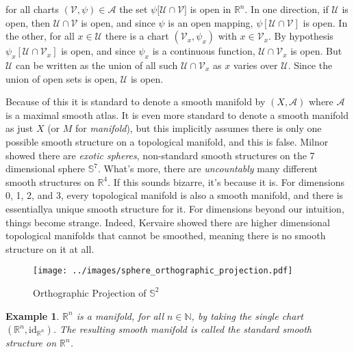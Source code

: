 \documentclass{article}
\theoremstyle{plain}
\theoremstyle{normal}
\newtheorem{example}{Example}[section]
\begin{document}
        for all charts $(\mathcal{V},\psi)\in\mathcal{A}$ the set
        $\psi\big[\mathcal{U}\cap\mathcal{V}]$ is open in $\mathbb{R}^{n}$. In
        one direction, if $\mathcal{U}$ is open, then
        $\mathcal{U}\cap\mathcal{V}$ is open, and since $\psi$ is an open
        mapping, $\psi[\mathcal{U}\cap\mathcal{V}]$ is open. In the other,
        for all $x\in\mathcal{U}$ there is a chart
        $(\mathcal{V}_{x},\psi_{x})$ with $x\in\mathcal{V}_{x}$. By hypothesis
        $\psi_{x}[\mathcal{U}\cap\mathcal{V}_{x}]$ is open,
        and since $\psi_{x}$ is a continuous function,
        $\mathcal{U}\cap\mathcal{V}_{x}$ is open. But $\mathcal{U}$ can be
        written as the union of all such $\mathcal{U}\cap\mathcal{V}_{x}$ as
        $x$ varies over $\mathcal{U}$. Since the union of open sets is open,
        $\mathcal{U}$ is open.
        \par\hfill\par
        Because of this it is standard to denote a smooth manifold by
        $(X,\mathcal{A})$ where $\mathcal{A}$ is a maximal smooth atlas. It is
        even more standard to denote a smooth manifold as just $X$ (or $M$ for
        \textit{manifold}), but this implicitly assumes there is only one
        possible smooth structure on a topological manifold, and this is false.
        Milnor showed there are \textit{exotic spheres}, non-standard smooth
        structures on the 7 dimensional sphere $\mathbb{S}^{7}$. What's more,
        there are \textit{uncountably} many different smooth structures on
        $\mathbb{R}^{4}$. If this sounds bizarre, it's because it is. For
        dimensions 0, 1, 2, and 3, every topological manifold is also a
        smooth manifold, and there is essentiallya unique smooth structure for
        it. For dimensions beyond our intuition, things become strange. Indeed,
        Kervaire showed there are higher dimensional topological manifolds that
        cannot be smoothed, meaning there is no smooth structure on it at all.
        \begin{figure}
            \centering
            \texttt{[image: ../images/sphere\_orthographic\_projection.pdf]}
            \caption{Orthographic Projection of $\mathbb{S}^{2}$}
            \label{fig:sphere_orthographic_projection}
        \end{figure}
        \begin{example}
            $\mathbb{R}^{n}$ is a manifold, for all $n\in\mathbb{N}$, by taking
            the single chart $(\mathbb{R}^{n},\textrm{id}_{\mathbb{R}^{n}})$.
            The resulting smooth manifold is called the \textit{standard} smooth
            structure on $\mathbb{R}^{n}$.
        \end{example}
\end{document}
